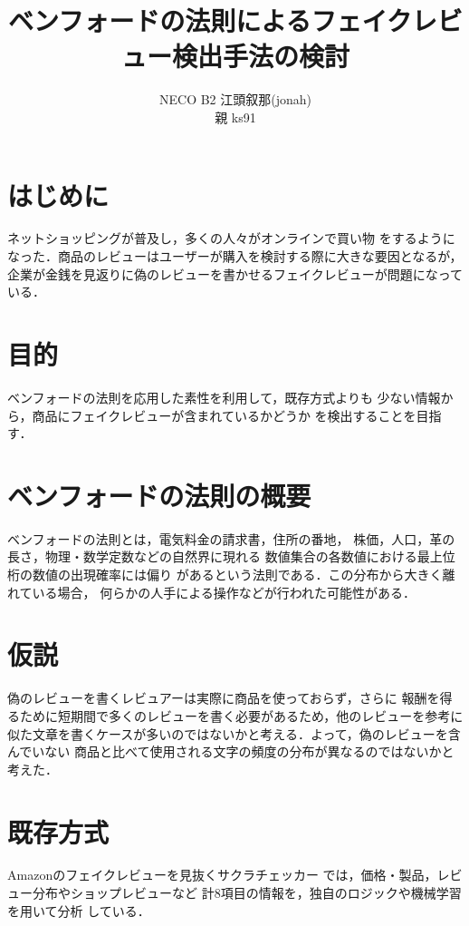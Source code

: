 \documentclass[a4paper, twocolumn]{jsarticle}
\begin{document}
\title{ベンフォードの法則によるフェイクレビュー検出手法の検討}
\author{
  NECO B2 江頭叙那(jonah)
  \\ 親 ks91 
}
\maketitle

\section{はじめに}

ネットショッピングが普及し，多くの人々がオンラインで買い物
をするようになった．商品のレビューはユーザーが購入を検討する際に大きな要因となるが，
企業が金銭を見返りに偽のレビューを書かせるフェイクレビューが問題になっている．

\section{目的}
ベンフォードの法則を応用した素性を利用して，既存方式よりも
少ない情報から，商品にフェイクレビューが含まれているかどうか
を検出することを目指す．

\section{ベンフォードの法則の概要}
ベンフォードの法則とは，電気料金の請求書，住所の番地，
株価，人口，革の長さ，物理・数学定数などの自然界に現れる
数値集合の各数値における最上位桁の数値の出現確率には偏り
があるという法則である．この分布から大きく離れている場合，
何らかの人手による操作などが行われた可能性がある．\cite{benford}

\section{仮説}
偽のレビューを書くレビュアーは実際に商品を使っておらず，さらに
報酬を得るために短期間で多くのレビューを書く必要があるため，他のレビューを参考に
似た文章を書くケースが多いのではないかと考える．よって，偽のレビューを含んでいない
商品と比べて使用される文字の頻度の分布が異なるのではないかと考えた．


\section{既存方式}
Amazonのフェイクレビューを見抜くサクラチェッカー \cite{sakura}
では，価格・製品，レビュー分布やショップレビューなど
計8項目の情報を，独自のロジックや機械学習を用いて分析
している．
\end{document}
